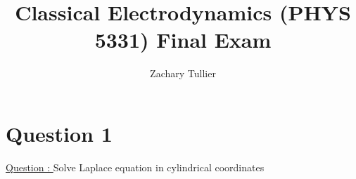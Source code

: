\documentclass[12pt]{article}
\begin{document}
\singlespacing  %
\title{Classical Electrodynamics (PHYS 5331) Final Exam}

\author[1]{Zachary Tullier}

\maketitle


\section{Question 1} \label{section1}
    \underline{Question : }
    Solve Laplace equation in cylindrical coordinates
    
\end{document}
